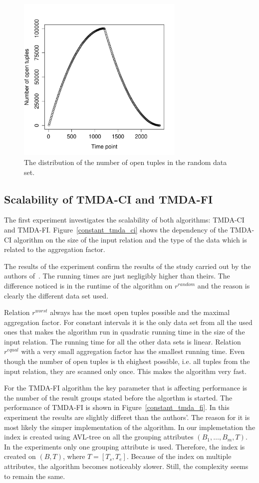 \documentclass[a4paper,11pt]{article}
\begin{document}
\begin{figure}[ht!]
\centering 
\includegraphics[width=80mm]{../graphs/random_open_tuples.pdf}
\caption{The distribution of the number of open tuples in the random data set.}
\label{open_tuples} 
\end{figure}

\subsection{Scalability of TMDA-CI and TMDA-FI}

The first experiment investigates the scalability of both algorithms: TMDA-CI and TMDA-FI. Figure~\ref{constant_tmda_ci} shows the dependency of the TMDA-CI algorithm on the size of the input relation and the type of the data which is related to the aggregation factor.

The results of the experiment confirm the results of the study carried out by the authors of~\cite{bohlen}. The running times are just negligibly higher than theirs. The difference noticed is in the runtime of the algorithm on $r^{random}$ and the reason is clearly the different data set used.

Relation $r^{worst}$ always has the most open tuples possible and the maximal aggregation factor. For constant intervals it is the only data set from all the used ones that makes the algorithm run in quadratic running time in the size of the input relation. The running time for all the other data sets is linear. Relation $r^{equal}$ with a very small aggregation factor has the smallest running time. Even though the number of open tuples is th ehighest possible, i.e. all tuples from the input relation, they are scanned only once. This makes the algorithm very fast.

For the TMDA-FI algorithm the key parameter that is affecting performance is the number of the result groups stated before the algorthm is started. The performance of TMDA-FI is shown in Figure~\ref{constant_tmda_fi}. In this experiment the results are slightly differet than the authors'. The reason for it is most likely the simper implementation of the algorithm. In our implemetation the index is created using AVL-tree on all the grouping attributes $(B_1,\dots,B_m,T)$. In the experiments only one grouping attribute is used. Therefore, the index is created on $(B,T)$, where $T = [T_s, T_e ]$. Because of the index on multiple attributes, the algorithm becomes noticeably slower. Still, the complexity seems to remain the same.
\end{document}
